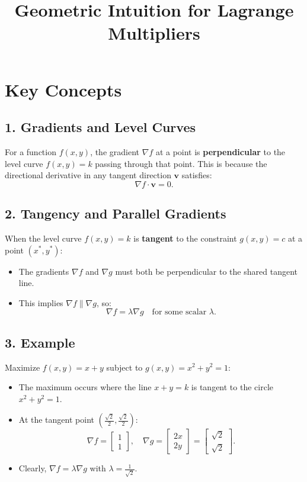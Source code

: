 \documentclass{article}
\begin{document}
\title{Geometric Intuition for Lagrange Multipliers}
\author{}
\date{}
\maketitle
\Large

\section*{Key Concepts}

\subsection*{1. Gradients and Level Curves}
For a function \( f(x, y) \), the gradient \( \nabla f \) at a point is \textbf{perpendicular} to the level curve \( f(x, y) = k \) passing through that point. This is because the directional derivative in any tangent direction \( \mathbf{v} \) satisfies:
\[
\nabla f \cdot \mathbf{v} = 0.
\]

\subsection*{2. Tangency and Parallel Gradients}
When the level curve \( f(x, y) = k \) is \textbf{tangent} to the constraint \( g(x, y) = c \) at a point \( (x^*, y^*) \):
\begin{itemize}
    \item The gradients \( \nabla f \) and \( \nabla g \) must both be perpendicular to the shared tangent line.
    \item This implies \( \nabla f \parallel \nabla g \), so:
    \[
    \nabla f = \lambda \nabla g \quad \text{for some scalar } \lambda.
    \]
\end{itemize}

\subsection*{3. Example}
Maximize \( f(x, y) = x + y \) subject to \( g(x, y) = x^2 + y^2 = 1 \):
\begin{itemize}
    \item The maximum occurs where the line \( x + y = k \) is tangent to the circle \( x^2 + y^2 = 1 \).
    \item At the tangent point \( \left( \frac{\sqrt{2}}{2}, \frac{\sqrt{2}}{2} \right) \):
    \[
    \nabla f = \begin{bmatrix} 1 \\ 1 \end{bmatrix}, \quad
    \nabla g = \begin{bmatrix} 2x \\ 2y \end{bmatrix} = \begin{bmatrix} \sqrt{2} \\ \sqrt{2} \end{bmatrix}.
    \]
    \item Clearly, \( \nabla f = \lambda \nabla g \) with \( \lambda = \frac{1}{\sqrt{2}} \).
\end{itemize}
\end{document}
